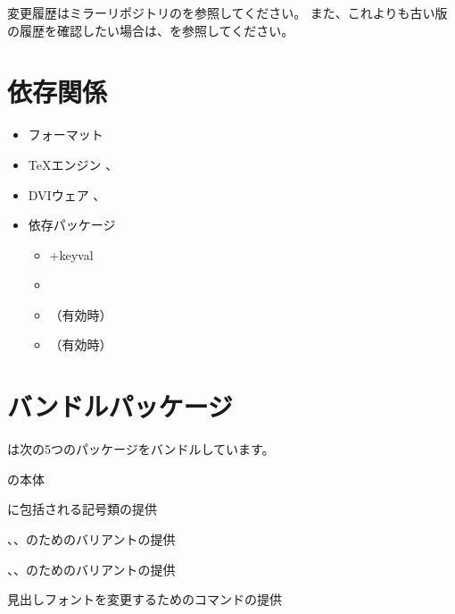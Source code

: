 \documentclass[../otf-unofficial-guide]{subfiles}
\begin{document}
変更履歴はミラーリポジトリの\href{https://github.com/texjporg/japanese-otf-mirror/blob/master/ChangeLog.md}{}を参照してください。
また、これよりも古い版の履歴を確認したい場合は、\href{https://github.com/texjporg/japanese-otf-mirror/blob/master/japanese-otf/readme-ja.txt}{}を参照してください。

\section{依存関係}

\begin{itemize}
  \item フォーマット   \pLaTeX
  \item {\TeX}エンジン \pLaTeX、\upLaTeX
  \item DVIウェア      
  、
  {\dvipdfmx}
  \item 依存パッケージ
  \begin{itemize}[labelsep=0.3zw]
    \item \pkg+{keyval}
    \item {}
    \item {}（有効時）
    \item {}（有効時）
  \end{itemize}
\end{itemize}

\section{バンドルパッケージ}

は次の5つのパッケージをバンドルしています。

\begin{description}[font=\sffamily\mdseries]
  \item[otf]        \tab {}の本体
  \item[ajmacros]   \tab {\AdobeJapan}に包括される記号類の提供
  \item[mlcid]      \tab {\fantizi}、{\jiantizi}、{\hankgo}のためのバリアントの提供
  \item[mlutf]      \tab {\fantizi}、{\jiantizi}、{\hankgo}のためのバリアントの提供
  \item[redeffont]  \tab 見出しフォントを変更するためのコマンドの提供
\end{description}
\end{document}
